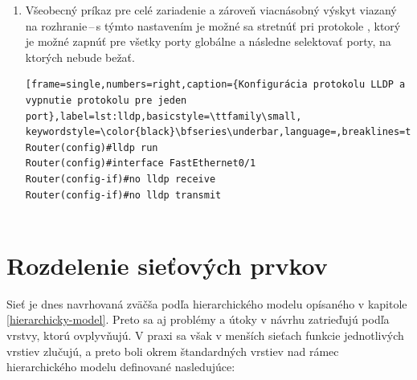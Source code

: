 \begin{enumerate}
\begin{minipage}{\linewidth}		
\begin{lstlisting}[frame=single,numbers=right,caption={Konfigurácia autentizácie OSPF na porte alebo v proccese},label=lst:ospf-auth,basicstyle=\ttfamily\small, keywordstyle=\color{black}\bfseries\underbar,language=,breaklines=true]
Router(config)#interface FastEthernet0/1
Router(config-if)#ip ospf message-digest-key 1 md5 heslo
Router(config-if)#ip ospf authentication message-digest

Router(config)#router ospf 1
Router(config)#area 0 authentication message-digest
Router(config)#area 0 authentication key-chain 1
\end{lstlisting}
\end{minipage}
	
	
	\item \vspace{2em} Všeobecný príkaz pre celé zariadenie a zároveň viacnásobný výskyt viazaný na rozhranie\,--\,s týmto nastavením je možné sa stretnúť pri protokole , ktorý je možné zapnúť pre všetky porty globálne a následne selektovať porty, na ktorých nebude bežať.
	
\begin{minipage}{\linewidth}		
\begin{lstlisting}[frame=single,numbers=right,caption={Konfigurácia protokolu LLDP a vypnutie protokolu pre jeden port},label=lst:lldp,basicstyle=\ttfamily\small, keywordstyle=\color{black}\bfseries\underbar,language=,breaklines=true]
Router(config)#lldp run
Router(config)#interface FastEthernet0/1
Router(config-if)#no lldp receive
Router(config-if)#no lldp transmit
		

\end{lstlisting}
\end{minipage}
	
\end{enumerate}

\section{Rozdelenie sieťových prvkov}
\label{hierarchydesign}
Sieť je dnes navrhovaná zväčša podľa hierarchického modelu opísaného v kapitole \ref{hierarchicky-model}. Preto sa aj problémy a útoky v návrhu zatrieďujú podľa vrstvy, ktorú ovplyvňujú. V praxi sa však v menších sieťach funkcie jednotlivých vrstiev zlučujú, a preto boli okrem štandardných vrstiev nad rámec hierarchického modelu definované nasledujúce:

